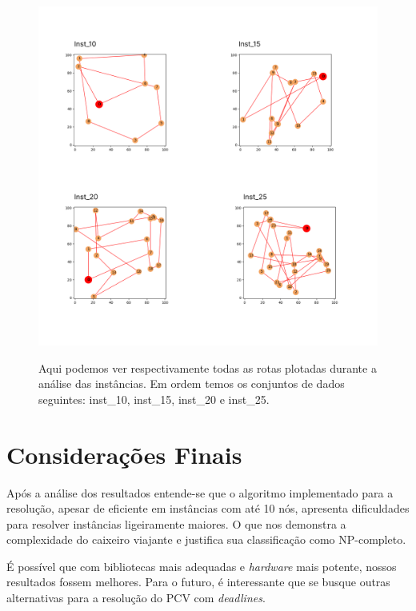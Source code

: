 \documentclass[12pt]{article}
\begin{document}
\begin{figure}[ht]
  \centering
  \includegraphics[scale=0.3]{imagens/images_compiled.png}
  \label{graph_inst}
  \caption{Aqui podemos ver respectivamente todas as rotas plotadas durante a análise das instâncias. Em ordem temos os conjuntos de dados seguintes: inst\_10, inst\_15, inst\_20 e inst\_25.}

\end{figure}

\FloatBarrier

\section{Considerações Finais}

Após a análise dos resultados entende-se que o algoritmo implementado para a resolução, apesar de eficiente em instâncias com até 10 nós, apresenta dificuldades para resolver instâncias ligeiramente maiores. O que nos demonstra a complexidade do caixeiro viajante e justifica sua classificação como NP-completo.

É possível que com bibliotecas mais adequadas e {\it hardware} mais potente, nossos resultados fossem melhores. Para o futuro, é interessante que se busque outras alternativas para a resolução do PCV com {\it deadlines}.


\clearpage



\end{document}
